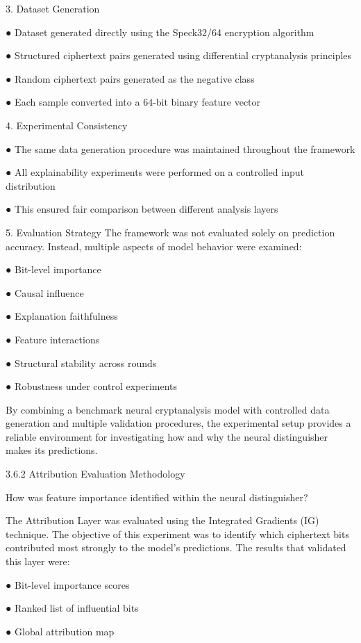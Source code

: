         

3. Dataset Generation 

●  Dataset generated directly using the Speck32/64 encryption algorithm 

●  Structured ciphertext pairs generated using differential cryptanalysis principles 

●  Random ciphertext pairs generated as the negative class 

●  Each sample converted into a 64-bit binary feature vector 

4. Experimental Consistency 

●  The same data generation procedure was maintained throughout the framework 

●  All explainability experiments were performed on a controlled input distribution 

●  This ensured fair comparison between different analysis layers 

5. Evaluation Strategy 
 The framework was not evaluated solely on prediction accuracy. Instead, multiple aspects of 
model behavior were examined: 

●  Bit-level importance 

●  Causal influence 

●  Explanation faithfulness 

●  Feature interactions 

●  Structural stability across rounds 

●  Robustness under control experiments 

By combining a benchmark neural cryptanalysis model with controlled data generation and 
multiple validation procedures, the experimental setup provides a reliable environment for 
investigating how and why the neural distinguisher makes its predictions. 

3.6.2 Attribution Evaluation Methodology 

How was feature importance identified within the neural distinguisher? 

The Attribution Layer was evaluated using the Integrated Gradients (IG) technique. The 
objective of this experiment was to identify which ciphertext bits contributed most strongly to 
the model's predictions. The results that validated this layer were: 


●  Bit-level importance scores 

●  Ranked list of influential bits 

●  Global attribution map 

